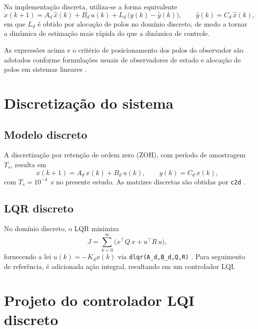 Na implementação discreta, utiliza-se a forma equivalente
\[
    \hat{x}(k+1)=A_d\,\hat{x}(k)+B_d\,u(k)+L_d\,\big(y(k)-\hat{y}(k)\big),\qquad \hat{y}(k)=C_d\,\hat{x}(k),
\]
em que $L_d$ é obtido por alocação de polos no domínio discreto, de modo a tornar a dinâmica de estimação mais rápida do que a dinâmica de controle.

As expressões acima e o critério de posicionamento dos polos do observador são adotados conforme formulações usuais de observadores de estado e alocação de polos em sistemas lineares \cite{Ogata1997,FranklinPowellWorkman1998}.
\section{Discretização do sistema}
\label{sec:discretizacao-sistema}
\subsection{Modelo discreto}
\label{sec:modelo-discreto}
A discretização por retenção de ordem zero (ZOH), com período de amostragem $T_s$, resulta em
\[
    x(k+1)=A_d\,x(k)+B_d\,u(k),\qquad y(k)=C_d\,x(k),
\]
com $T_s=10^{-4}$~s no presente estudo. As matrizes discretas são obtidas por \texttt{c2d} \cite{FranklinPowellWorkman1998,BrunoAAngelico2018}.
\subsection{LQR discreto}
\label{sec:projeto-lqr-discreto}
No domínio discreto, o LQR minimiza
\[
    J=\sum_{k=0}^{\infty} \big(x^\top Q\,x + u^\top R\,u\big),
\]
fornecendo a lei $u(k)=-K_d x(k)$ via \texttt{dlqr(A\_d,B\_d,Q,R)} \cite{FranklinPowellWorkman1998,Ogata1997}. Para seguimento de referência, é adicionada ação integral, resultando em um controlador LQI.
\section{Projeto do controlador LQI discreto}
\label{sec:controle-lqi-discreto}
